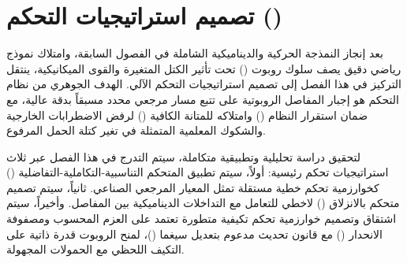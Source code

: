 \chapter{تصميم استراتيجيات التحكم ()}
\label{ch:control}

بعد إنجاز النمذجة الحركية والديناميكية الشاملة في الفصول السابقة، وامتلاك نموذج رياضي دقيق يصف سلوك روبوت () تحت تأثير الكتل المتغيرة والقوى الميكانيكية، ينتقل التركيز في هذا الفصل إلى تصميم استراتيجيات التحكم الآلي. الهدف الجوهري من نظام التحكم هو إجبار المفاصل الروبوتية على تتبع مسار مرجعي محدد مسبقاً بدقة عالية، مع ضمان استقرار النظام () وامتلاكه للمتانة الكافية () لرفض الاضطرابات الخارجية والشكوك المعلمية المتمثلة في تغير كتلة الحمل المرفوع.

لتحقيق دراسة تحليلية وتطبيقية متكاملة، سيتم التدرج في هذا الفصل عبر ثلاث استراتيجيات تحكم رئيسية:
أولاً، سيتم تطبيق المتحكم التناسبية-التكاملية-التفاضلية () كخوارزمية تحكم خطية مستقلة تمثل المعيار المرجعي الصناعي. ثانياً، سيتم تصميم متحكم بالانزلاق () لاخطي للتعامل مع التداخلات الديناميكية بين المفاصل. وأخيراً، سيتم اشتقاق وتصميم خوارزمية تحكم تكيفية متطورة تعتمد على العزم المحسوب ومصفوفة الانحدار () مع قانون تحديث مدعوم بتعديل سيغما ()، لمنح الروبوت قدرة ذاتية على التكيف اللحظي مع الحمولات المجهولة.





